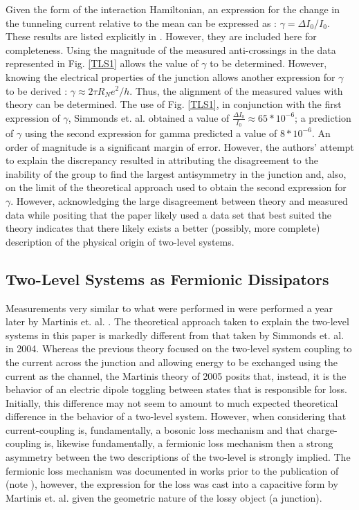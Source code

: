\documentclass[aps,prl,reprint,groupedaddress]{revtex4-1}
\begin{document}
Given the form of the interaction Hamiltonian, an expression for the change in the tunneling current relative to the mean can be expressed as : $\gamma = \Delta I_0/ I_0$. These results are listed explicitly in \cite{simmonds_decoherence_2004}. However, they are included here for completeness. Using the magnitude of the measured anti-crossings in the data represented in Fig. \ref{TLS1} allows the value of $\gamma$ to be determined. However, knowing the electrical properties of the junction allows another expression for $\gamma$ to be derived : $\gamma \approx 2\tau R_N e^2/h$. Thus, the alignment of the measured values with theory can be determined. The use of Fig. \ref{TLS1}, in conjunction with the first expression of $\gamma$, Simmonds et. al. obtained a value of $\frac{\Delta I_0}{I_0} \approx 65*10^{-6}$; a prediction of $\gamma$ using the second expression for gamma predicted a value of $8*10^{-6}$. An order of magnitude is a significant margin of error. However, the authors' attempt to explain the discrepancy resulted in attributing the disagreement to the inability of the group to find the largest antisymmetry in the junction and, also, on the limit of the theoretical approach used to obtain the second expression for $\gamma$. However, acknowledging the large disagreement between theory and measured data while positing that the paper likely used a data set that best suited the theory indicates that there likely exists a better (possibly, more complete) description of the physical origin of two-level systems.



\subsection{Two-Level Systems as Fermionic Dissipators}

Measurements very similar to what were performed in \cite{simmonds_decoherence_2004} were performed a year later by Martinis et. al. \cite{martinis_decoherence_2005}. The theoretical approach taken to explain the two-level systems in this paper is markedly different from that taken by Simmonds et. al. in 2004. Whereas the previous theory focused on the two-level system coupling to the current across the junction and allowing energy to be exchanged using the current as the channel, the Martinis theory of 2005 posits that, instead, it is the behavior of an electric dipole toggling between states that is responsible for loss. Initially, this difference may not seem to amount to much expected theoretical difference in the behavior of a two-level system. However, when considering that current-coupling is, fundamentally, a bosonic loss mechanism and that charge-coupling is, likewise fundamentally, a fermionic loss mechanism then a strong asymmetry between the two descriptions of the two-level is strongly implied. The fermionic loss mechanism was documented in works prior to the publication of \cite{martinis_decoherence_2005} (note \cite{von_schickfus_saturation_1977}), however, the expression for the loss was cast into a capacitive form by Martinis et. al. given the geometric nature of the lossy object (a junction). 
\end{document}

